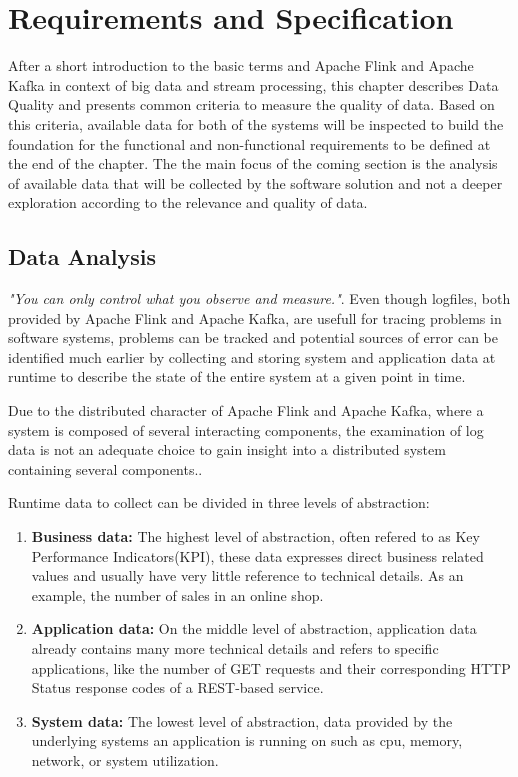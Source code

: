 \chapter{Requirements and Specification}

After a short introduction to the basic terms and Apache Flink and Apache Kafka in
context of big data and stream processing, this chapter describes Data Quality and
presents common criteria to measure the quality of data. Based on this criteria, available data
for both of the systems will be inspected to build the foundation for the functional
and non-functional requirements to be defined at the end of the chapter. The the main focus
of the coming section is the analysis of available data that will be collected by the software
solution and not a deeper exploration according to the relevance and quality of data.

\section{Data Analysis}

\textit{"You can only control what you observe and measure."}\cite{Ebert07}. Even though logfiles, both
provided by Apache Flink and Apache Kafka, are usefull for tracing problems in software
systems, problems can be tracked and potential sources of error can be identified much
earlier by collecting and storing system and application data at runtime to describe the
state of the entire system at a given point in time.

Due to the distributed character of Apache Flink and Apache Kafka, where a system is
composed of several interacting components, the examination of log data is not an
adequate choice to gain insight into a distributed system containing several components.\cite{VanL14}.

Runtime data to collect can be divided in three levels of abstraction:

\begin{enumerate}
    \item \textbf{Business data:} The highest level of abstraction, often refered to as Key Performance
    Indicators(KPI), these data expresses direct business related values and
    usually have very little reference to technical details. As an example, the number of
    sales in an online shop.
    \item \textbf{Application data:} On the middle level of abstraction, application data already
    contains many more technical details and refers to specific applications, like the
    number of GET requests and their corresponding HTTP Status response codes of a
    REST-based service.
    \item \textbf{System data:} The lowest level of abstraction, data provided by the underlying
    systems an application is running on such as cpu, memory, network, or system utilization.
\end{enumerate}


